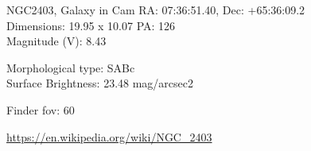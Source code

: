 \begin{block}{NGC2403, Galaxy in Cam}
    RA: 07:36:51.40, Dec: +65:36:09.2 \\ 
    Dimensions: 19.95 x 10.07 PA: 126 \\ 
    Magnitude (V): 8.43

    Morphological type: SABc \\ 
    Surface Brightness: 23.48 mag/arcsec2 


    Finder fov: 60 

    \url{https://en.wikipedia.org/wiki/NGC_2403} 
\end{block}